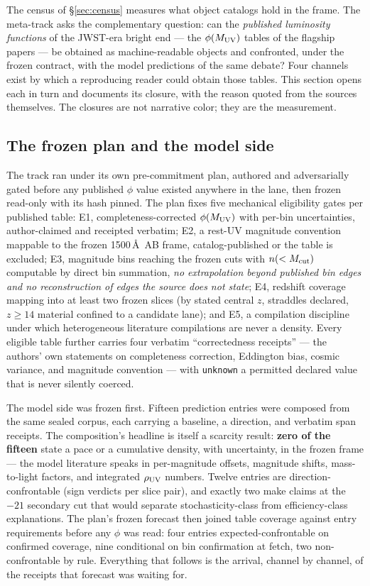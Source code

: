 \documentclass[twocolumn]{aastex702}
\begin{document}
The census of \S\ref{sec:census} measures what object catalogs hold in the frame. The
meta-track asks the complementary question: can the \emph{published luminosity functions}
of the JWST-era bright end --- the $\phi(M_{\rm UV})$ tables of the flagship papers ---
be obtained as machine-readable objects and confronted, under the frozen contract, with
the model predictions of the same debate? Four channels exist by which a reproducing
reader could obtain those tables. This section opens each in turn and documents its
closure, with the reason quoted from the sources themselves. The closures are not
narrative color; they are the measurement.

\subsection{The frozen plan and the model side} \label{sec:metaplan}

The track ran under its own pre-commitment plan, authored and adversarially gated before
any published $\phi$ value existed anywhere in the lane, then frozen read-only with its
hash pinned. The plan fixes five mechanical eligibility gates per published table: E1,
completeness-corrected $\phi(M_{\rm UV})$ with per-bin uncertainties, author-claimed and
receipted verbatim; E2, a rest-UV magnitude convention mappable to the frozen 1500\,\AA\
AB frame, catalog-published or the table is excluded; E3, magnitude bins reaching the
frozen cuts with $n(<M_{\rm cut})$ computable by direct bin summation, \emph{no
extrapolation beyond published bin edges and no reconstruction of edges the source does
not state}; E4, redshift coverage mapping into at least two frozen slices (by stated
central $z$, straddles declared, $z\ge14$ material confined to a candidate lane); and E5,
a compilation discipline under which heterogeneous literature compilations are never a
density. Every eligible table further carries four verbatim ``correctedness receipts'' ---
the authors' own statements on completeness correction, Eddington bias, cosmic variance,
and magnitude convention --- with \texttt{unknown} a permitted declared value that is
never silently coerced.

The model side was frozen first. Fifteen prediction entries were composed from the same
sealed corpus, each carrying a baseline, a direction, and verbatim span receipts. The
composition's headline is itself a scarcity result: \textbf{zero of the fifteen} state a
pace or a cumulative density, with uncertainty, in the frozen frame --- the model
literature speaks in per-magnitude offsets, magnitude shifts, mass-to-light factors, and
integrated $\rho_{\rm UV}$ numbers. Twelve entries are direction-confrontable (sign
verdicts per slice pair), and exactly two make claims at the $-21$ secondary cut that
would separate stochasticity-class from efficiency-class explanations. The plan's frozen
forecast then joined table coverage against entry requirements before any $\phi$ was
read: four entries expected-confrontable on confirmed coverage, nine conditional on bin
confirmation at fetch, two non-confrontable by rule. Everything that follows is the
arrival, channel by channel, of the receipts that forecast was waiting for.
\end{document}
